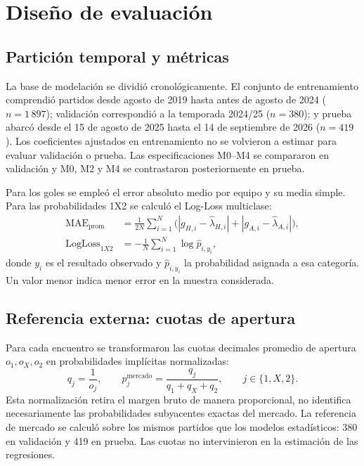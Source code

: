 \documentclass[11pt,a4paper]{article}
\begin{document}
\section{Diseño de evaluación}
\subsection{Partición temporal y métricas}
La base de modelación se dividió cronológicamente. El conjunto de entrenamiento comprendió partidos desde agosto de 2019 hasta antes de agosto de 2024 ($n=1\,897$); validación correspondió a la temporada 2024/25 ($n=380$); y prueba abarcó desde el 15 de agosto de 2025 hasta el 14 de septiembre de 2026 ($n=419$). Los coeficientes ajustados en entrenamiento no se volvieron a estimar para evaluar validación o prueba. Las especificaciones M0--M4 se compararon en validación y M0, M2 y M4 se contrastaron posteriormente en prueba.

Para los goles se empleó el error absoluto medio por equipo y su media simple. Para las probabilidades 1X2 se calculó el Log-Loss multiclase:
\begin{align}
\operatorname{MAE}_{\mathrm{prom}}&=\frac{1}{2N}\sum_{i=1}^{N}\bigl(
|g_{H,i}-\widehat\lambda_{H,i}|+|g_{A,i}-\widehat\lambda_{A,i}|\bigr),\\
\operatorname{LogLoss}_{1X2}&=-\frac{1}{N}\sum_{i=1}^{N}\log\widehat p_{i,y_i},
\label{eq:metrics}
\end{align}
donde $y_i$ es el resultado observado y $\widehat p_{i,y_i}$ la probabilidad asignada a esa categoría. Un valor menor indica menor error en la muestra considerada.

\subsection{Referencia externa: cuotas de apertura}
Para cada encuentro se transformaron las cuotas decimales promedio de apertura $o_1,o_X,o_2$ en probabilidades implícitas normalizadas:
\begin{equation}
q_j=\frac{1}{o_j},\qquad
p_j^{\mathrm{mercado}}=\frac{q_j}{q_1+q_X+q_2},\qquad
j\in\{1,X,2\}.
\label{eq:market}
\end{equation}
Esta normalización retira el margen bruto de manera proporcional, no identifica necesariamente las probabilidades subyacentes exactas del mercado. La referencia de mercado se calculó sobre los mismos partidos que los modelos estadísticos: 380 en validación y 419 en prueba. Las cuotas no intervinieron en la estimación de las regresiones.
\end{document}
